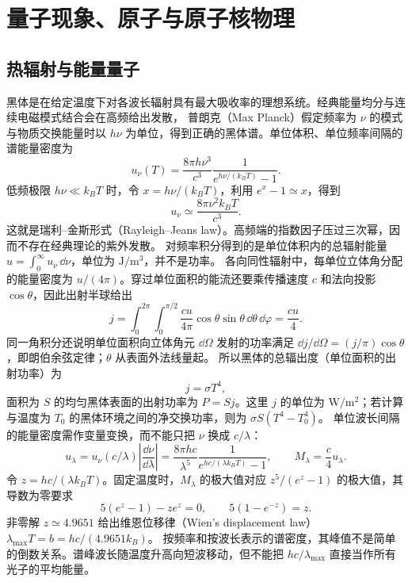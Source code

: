 \begingroup
\hypersetup{bookmarksdepth=3}
\newcommand{\ModernAnswerLabel}{{\bfseries\color{DeepBlue}解答}}
\chapter{量子现象、原子与原子核物理}

\section{热辐射与能量量子}

黑体是在给定温度下对各波长辐射具有最大吸收率的理想系统。经典能量均分与连续电磁模式结合会在高频给出发散，
普朗克（Max Planck）假定频率为 $\nu$ 的模式与物质交换能量时以 $h\nu$ 为单位，得到正确的黑体谱。单位体积、单位频率间隔的谱能量密度为
\begin{equation}
 u_\nu(T)=\frac{8\pi h\nu^3}{c^3}\frac1{e^{h\nu/(k_BT)}-1}.
\end{equation}
低频极限 $h\nu\ll k_BT$ 时，令 $x=h\nu/(k_BT)$，利用 $e^x-1\simeq x$，得到
\[
 u_\nu\simeq\frac{8\pi\nu^2k_BT}{c^3}.
\]
这就是瑞利--金斯形式（Rayleigh--Jeans law）。高频端的指数因子压过三次幂，因而不存在经典理论的紫外发散。
对频率积分得到的是单位体积内的总辐射能量 $u=\int_0^\infty u_\nu\,\dd\nu$，单位为 $\mathrm{J/m^3}$，并不是功率。
各向同性辐射中，每单位立体角分配的能量密度为 $u/(4\pi)$。穿过单位面积的能流还要乘传播速度 $c$ 和法向投影 $\cos\theta$，因此出射半球给出
\[
 j=\int_0^{2\pi}\!\int_0^{\pi/2}\frac{cu}{4\pi}\cos\theta\sin\theta\,\dd\theta\,\dd\varphi
 =\frac{cu}{4}.
\]
同一角积分还说明单位面积向立体角元 $\dd\Omega$ 发射的功率满足 $\dd j/\dd\Omega=(j/\pi)\cos\theta$，即朗伯余弦定律；$\theta$ 从表面外法线量起。
所以黑体的总辐出度（单位面积的出射功率）为
\begin{equation}
 j=\sigma T^4,
\end{equation}
面积为 $S$ 的均匀黑体表面的出射功率为 $P=Sj$。这里 $j$ 的单位为 $\mathrm{W/m^2}$；若计算与温度为 $T_0$ 的黑体环境之间的净交换功率，则为 $\sigma S(T^4-T_0^4)$。
单位波长间隔的能量密度需作变量变换，而不能只把 $\nu$ 换成 $c/\lambda$：
\[
 u_\lambda=u_\nu(c/\lambda)\left|\frac{\dd\nu}{\dd\lambda}\right|
 =\frac{8\pi hc}{\lambda^5}\frac1{e^{hc/(\lambda k_BT)}-1},\qquad M_\lambda=\frac c4u_\lambda.
\]
令 $z=hc/(\lambda k_BT)$。固定温度时，$M_\lambda$ 的极大值对应 $z^5/(e^z-1)$ 的极大值，其导数为零要求
\[
 5(e^z-1)-ze^z=0,\qquad 5(1-e^{-z})=z.
\]
非零解 $z\simeq4.9651$ 给出维恩位移律（Wien's displacement law）$\lambda_{\max}T=b=hc/(4.9651k_B)$。
按频率和按波长表示的谱密度，其峰值不是简单的倒数关系。谱峰波长随温度升高向短波移动，但不能把
$hc/\lambda_{\max}$ 直接当作所有光子的平均能量。

